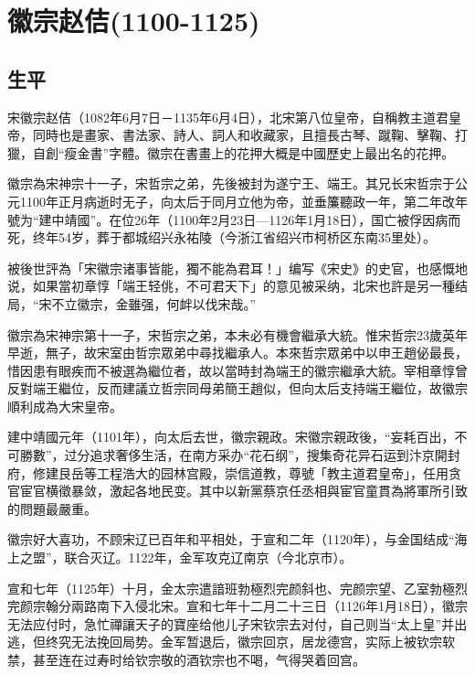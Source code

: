 
\section{徽宗赵佶\tiny(1100-1125)}

\subsection{生平}

宋徽宗赵佶（1082年6月7日－1135年6月4日），北宋第八位皇帝，自稱教主道君皇帝，同時也是畫家、書法家、詩人、詞人和收藏家，且擅長古琴、蹴鞠、擊鞠、打獵，自創“瘦金書”字體。徽宗在書畫上的花押大概是中國歷史上最出名的花押。

徽宗為宋神宗十一子，宋哲宗之弟，先後被封为遂宁王、端王。其兄长宋哲宗于公元1100年正月病逝时无子，向太后于同月立他为帝，並垂簾聽政一年，第二年改年號为“建中靖國”。在位26年（1100年2月23日—1126年1月18日），国亡被俘因病而死，终年54岁，葬于都城绍兴永祐陵（今浙江省绍兴市柯桥区东南35里处）。

被後世評為「宋徽宗诸事皆能，獨不能為君耳！」编写《宋史》的史官，也感慨地说，如果當初章惇「端王轻佻，不可君天下」的意见被采纳，北宋也許是另一種结局，“宋不立徽宗，金雖强，何衅以伐宋哉。”

徽宗為宋神宗第十一子，宋哲宗之弟，本未必有機會繼承大統。惟宋哲宗23歲英年早逝，無子，故宋室由哲宗眾弟中尋找繼承人。本來哲宗眾弟中以申王趙佖最長，惜因患有眼疾而不被選為繼位者，故以當時封為端王的徽宗繼承大統。宰相章惇曾反對端王繼位，反而建議立哲宗同母弟簡王趙似，但向太后支持端王繼位，故徽宗順利成為大宋皇帝。

建中靖國元年（1101年），向太后去世，徽宗親政。宋徽宗親政後，“妄耗百出，不可勝數”，过分追求奢侈生活，在南方采办“花石纲”，搜集奇花异石运到汴京開封府，修建艮岳等工程浩大的园林宫殿，崇信道教，尊號「教主道君皇帝」，任用贪官宦官横徵暴敛，激起各地民变。其中以新黨蔡京任丞相與宦官童貫為將軍所引致的問題最嚴重。

徽宗好大喜功，不顾宋辽已百年和平相处，于宣和二年（1120年），与金国结成“海上之盟”，联合灭辽。1122年，金军攻克辽南京（今北京市）。

宣和七年（1125年）十月，金太宗遣諳班勃極烈完颜斜也、完颜宗望、乙室勃極烈完颜宗翰分兩路南下入侵北宋。宣和七年十二月二十三日（1126年1月18日），徽宗无法应付时，急忙禪讓天子的寶座给他儿子宋钦宗去对付，自己则当“太上皇”并出逃，但终究无法挽回局势。金军暂退后，徽宗回京，居龙德宫，实际上被钦宗软禁，甚至连在过寿时给钦宗敬的酒钦宗也不喝，气得哭着回宫。

